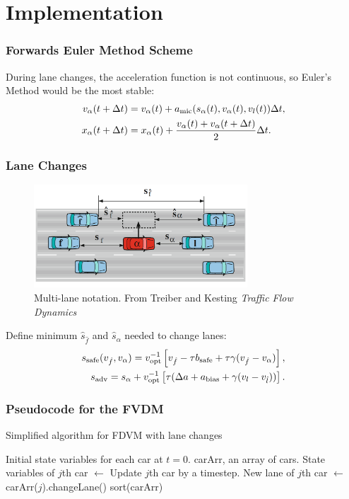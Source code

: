 \documentclass{beamer}
\begin{document}
\section{Implementation}
\begin{frame}
  \frametitle{Forwards Euler Method Scheme}
  During lane changes, the acceleration function is not continuous, so Euler's Method would be the most stable:
  \begin{align*}
    v_\alpha(t+\Delta t) &= v_\alpha(t) +a_{\rm mic}(s_\alpha(t), v_\alpha (t), v_l (t))\Delta t, \\
    x_\alpha(t + \Delta t) &= x_\alpha(t) + \frac{v_\alpha (t) + v_\alpha (t+\Delta t)}{2}\Delta t.
\end{align*}
\end{frame}

\begin{frame}
  \frametitle{Lane Changes}
  \begin{figure}[H]
    \includegraphics[width=8cm]{lane_change_diagram.PNG}
    \centering
    \caption{Multi-lane notation. From Treiber and Kesting \textit{Traffic Flow Dynamics}}
\end{figure}
  Define minimum $\hat s_{\hat f}$ and $\hat s_{\alpha}$ needed to change lanes: 
  \begin{align*}
    s_{\rm safe} (v_{\hat f}, v_{\alpha}) = v_{\rm opt}^{-1} \left[v_{\hat f} -\tau b_{\rm safe} + \tau \gamma (v_{\hat f} - v_{\alpha}) \right],\\
    s_{\rm adv} = s_{\alpha} + v_{\rm opt}^{-1} \left[\tau(\Delta a + a_{\rm bias} + \gamma(v_l - v_{\hat l}))\right].
  \end{align*}
\end{frame}

\begin{frame}
  \frametitle{Pseudocode for the FVDM}
  \begin{algorithm}
    \caption{Simplified algorithm for FDVM with lane changes}\label{alg:car-following-lane}
    \begin{algorithmic}
    \Require Initial state variables for each car at $t=0$. 
    \Require carArr, an array of cars.
      \State State variables of $j$th car $\gets$ Update $j$th car by a timestep.
      \State New lane of $j$th car $\gets$ carArr($j$).changeLane()
      \EndFor
      \State sort(carArr)
    \EndFor
    \end{algorithmic}
    \end{algorithm}
\end{frame}
\end{document}
